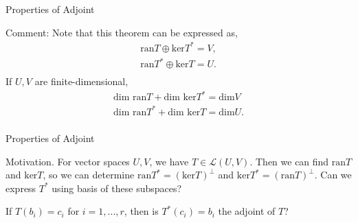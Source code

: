 \documentclass[hyperref={pdfpagelabels=true}]{beamer}
\renewcommand{\L}{\mathcal{L}}
\newcommand{\<}{\langle}
\renewcommand{\>}{\rangle}
\begin{document}
        \begin{frame}{Properties of Adjoint}
            \begin{block}{Comment:}
                Note that this theorem can be expressed as,
            \[
                \begin{aligned}
                    \text{ran}T\oplus\text{ker}T^{*} = V,\\
                    \text{ran}T^{*}\oplus\text{ker}T = U.\\
                \end{aligned}
            \]
                If $U,V$ are finite-dimensional,
            \[
            \begin{aligned}
                \text{dim } \text{ran}T+\text{dim } \text{ker}T^{*} = \text{dim}V\\
                \text{dim } \text{ran}T^{*}+\text{dim } \text{ker}T = \text{dim}U.\\
            \end{aligned}
            \]
        \end{block}
        \end{frame}
        \begin{frame}{Properties of Adjoint}
            \begin{block}{Motivation.}
                For vector spaces $U,V$, we have $T \in \L(U,V)$. Then we can find $\text{ran}T$ and $\text{ker}T$, so we can determine $\text{ran}T^{*} = (\text{ker}T)^{\bot}$ and $\text{ker}T^{*} = (\text{ran}T)^{\bot}$. Can we express $T^{*}$ using basis of these subspaces?
            \begin{center}
            \end{center}
            If $T(b_{i}) = c_{i}$ for $i = 1,...,r$, then is $T^{*}(c_{i}) = b_{i}$ the adjoint of $T$?
        \end{block}
    \end{frame}
\end{document}
